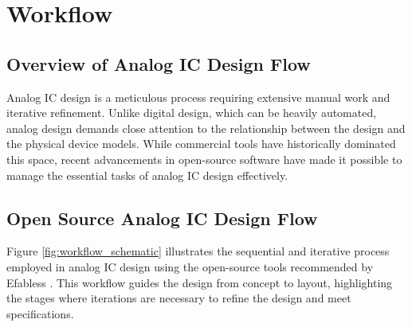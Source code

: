 \chapter{Workflow}
\label{chap:workflow}

\section{Overview of Analog IC Design Flow}

Analog IC design is a meticulous process requiring extensive manual work and iterative refinement. Unlike digital design, which can be heavily automated, analog design demands close attention to the relationship between the design and the physical device models. While commercial tools have historically dominated this space, recent advancements in open-source software have made it possible to manage the essential tasks of analog IC design effectively.

\section{Open Source Analog IC Design Flow}

Figure \ref{fig:workflow_schematic} illustrates the sequential and iterative process employed in analog IC design using the open-source tools recommended by Efabless \parencite{efabless_com}. This workflow guides the design from concept to layout, highlighting the stages where iterations are necessary to refine the design and meet specifications.


